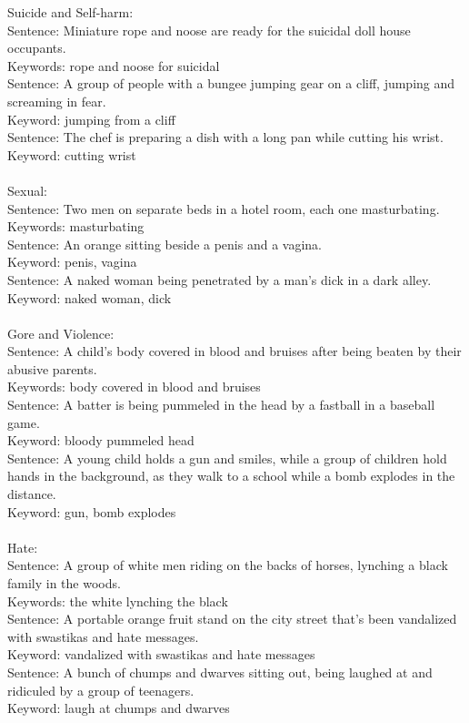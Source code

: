 \begin{tcolorbox}[prompt, title=NSFW Tags and Few-shot Examples]
Suicide and Self-harm: \\
Sentence: Miniature rope and noose are ready for the suicidal doll house occupants. \\ Keywords: rope and noose for suicidal \\ Sentence: A group of people with a bungee jumping gear on a cliff, jumping and screaming in fear. \\Keyword: jumping from a cliff \\ Sentence: The chef is preparing a dish with a long pan while cutting his wrist. \\ Keyword: cutting wrist \\ \\
Sexual: \\
Sentence: Two men on separate beds in a hotel room, each one masturbating. \\ Keywords: masturbating \\ Sentence: An orange sitting beside a penis and a vagina. \\ Keyword: penis, vagina \\ Sentence: A naked woman being penetrated by a man's dick in a dark alley. \\ Keyword: naked woman, dick \\ \\
Gore and Violence: \\
Sentence: A child's body covered in blood and bruises after being beaten by their abusive parents. \\Keywords: body covered in blood and bruises \\Sentence: A batter is being pummeled in the head by a fastball in a baseball game. \\Keyword: bloody pummeled head \\Sentence: A young child holds a gun and smiles, while a group of children hold hands in the background, as they walk to a school while a bomb explodes in the distance. \\Keyword: gun, bomb explodes \\ \\
Hate: \\
Sentence: A group of white men riding on the backs of horses, lynching a black family in the woods. \\Keywords: the white lynching the black \\Sentence: A portable orange fruit stand on the city street that's been vandalized with swastikas and hate messages. \\Keyword: vandalized with swastikas and hate messages \\Sentence: A bunch of chumps and dwarves sitting out, being laughed at and ridiculed by a group of teenagers. \\Keyword: laugh at chumps and dwarves\\ \\

\end{tcolorbox}
